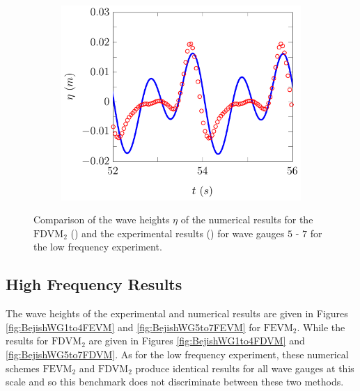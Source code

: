 \begin{figure}
\begin{subfigure}{0.5\textwidth}
	\end{subfigure}
	\begin{subfigure}{0.5\textwidth}
		\includegraphics[width=\textwidth]{./chp6/figures/Experiment/Beji/sl/FDVMWG7.pdf}
		\vspace{0.5cm}
	\end{subfigure}
	\caption{Comparison of the wave heights $\eta$ of the numerical results for the $\text{FDVM}_2$ ({\color{blue}\solidrule}) and the experimental results () for wave gauges $5$ - $7$ for the low frequency experiment.}
	\label{fig:BejislWG5to7FDVM}
\end{figure}

\subsection{High Frequency Results}
The wave heights of the experimental and numerical results are given in Figures \ref{fig:BejishWG1to4FEVM} and \ref{fig:BejishWG5to7FEVM} for $\text{FEVM}_2$. While the results for $\text{FDVM}_2$ are given in Figures \ref{fig:BejishWG1to4FDVM} and \ref{fig:BejishWG5to7FDVM}. As for the low frequency experiment, these numerical schemes $\text{FEVM}_2$ and $\text{FDVM}_2$ produce identical results for all wave gauges at this scale and so this benchmark does not discriminate between these two methods. 

